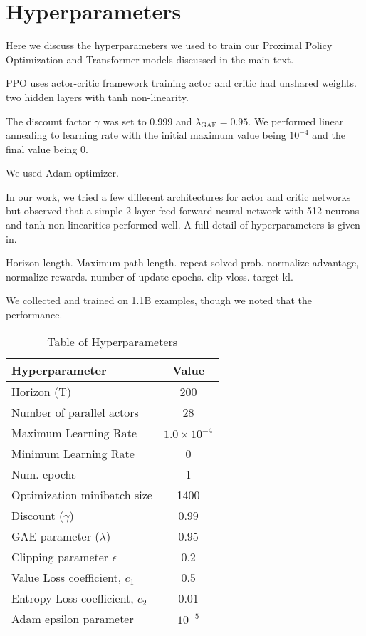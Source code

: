 
\section{Hyperparameters}\label{app:hyperparameters}

Here we discuss the hyperparameters we used to train our Proximal Policy Optimization and Transformer models discussed in the main text. 

PPO uses actor-critic framework training 
 actor and critic had unshared weights. 
two hidden layers with tanh non-linearity. 

The discount factor $\gamma$ was set to 0.999 and $\lambda_{\text{GAE}} = 0.95$. We performed linear annealing to learning rate with the initial maximum value being $10^{-4}$ and the final value being $0$.

We used Adam optimizer.


In our work, we tried a few different architectures for actor and critic networks but observed that a simple 2-layer feed forward neural network with 512 neurons and tanh non-linearities performed well. A full detail of hyperparameters is given in.

Horizon length. Maximum path length. repeat solved prob. normalize advantage, normalize rewards. number of update epochs. clip vloss. target kl.

We collected and trained on 1.1B examples, though we noted that the performance. 


\begin{table}[ht]
    \centering
    \begin{tabular}{lc}
        \hline
        Hyperparameter & Value \\
        \hline
        Horizon (T) & 200 \\
        Number of parallel actors & 28 \\
        Maximum Learning Rate & $1.0 \times 10^{-4}$ \\
        Minimum Learning Rate & 0 \\
        Num. epochs & 1 \\
        Optimization minibatch size & 1400 \\
        Discount ($\gamma$) & 0.99 \\
        GAE parameter ($\lambda$) & 0.95 \\
        Clipping parameter $\epsilon$ & 0.2 \\
        Value Loss coefficient, $c_1$ & 0.5 \\
        Entropy Loss coefficient, $c_2$ & 0.01 \\
        Adam epsilon parameter & $10^{-5}$ \\
        \hline
    \end{tabular}
    \caption{Table of Hyperparameters}
    \label{tab:hyperparameters}
\end{table}

